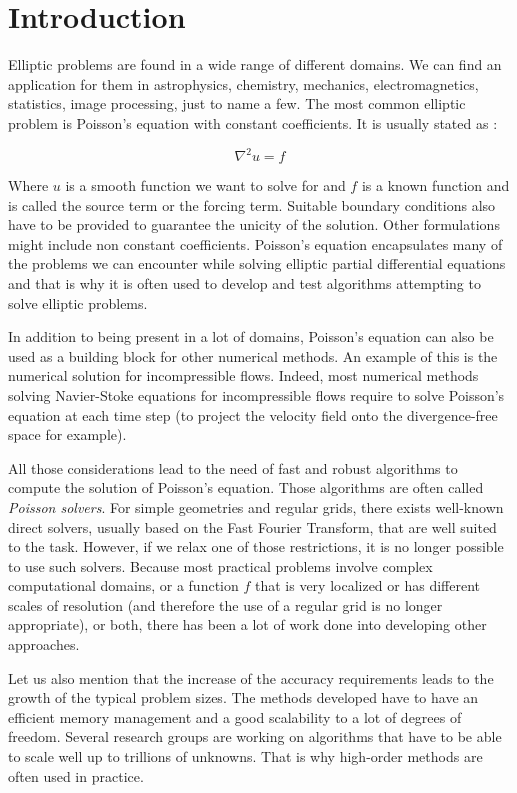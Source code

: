 \chapter*{Introduction}

Elliptic problems are found in a wide range of different domains. We can find an application for them in astrophysics, chemistry, mechanics, electromagnetics, statistics, image processing, just to name a few. The most common elliptic problem is Poisson's equation with constant coefficients. It is usually stated as :

$$\nabla^2 u = f$$

Where $u$ is a smooth function we want to solve for and $f$ is a known function and is called the source term or the forcing term. Suitable boundary conditions also have to be provided to guarantee the unicity of the solution. Other formulations might include non constant coefficients. Poisson's equation encapsulates many of the problems we can encounter while solving elliptic partial differential equations and that is why it is often used to develop and test algorithms attempting to solve elliptic problems.   

In addition to being present in a lot of domains, Poisson's equation can also be used as a building block for other numerical methods. An example of this is the numerical solution for incompressible flows. Indeed, most numerical methods solving Navier-Stoke equations for incompressible flows require to solve Poisson's equation at each time step (to project the velocity field onto the divergence-free space for example). 

All those considerations lead to the need of fast and robust algorithms to compute the solution of Poisson's equation. Those algorithms are often called \textit{Poisson solvers}. For simple geometries and regular grids, there exists well-known direct solvers, usually based on the Fast Fourier Transform, that are well suited to the task. However, if we relax one of those restrictions, it is no longer possible to use such solvers. Because most practical problems involve complex computational domains, or a function $f$ that is very localized or has different scales of resolution (and therefore the use of a regular grid is no longer appropriate), or both, there has been a lot of work done into developing other approaches. 

Let us also mention that the increase of the accuracy requirements leads to the growth of the typical problem sizes. The methods developed have to have an efficient memory management and a good scalability to a lot of degrees of freedom. Several research groups are working on algorithms that have to be able to scale well up to trillions of unknowns. That is why high-order methods are often used in practice.  

